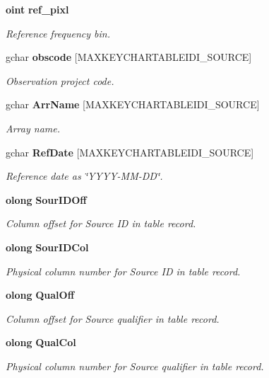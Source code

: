 \begin{CompactItemize}
{\bf oint} {\bf ref\_\-pixl}
\begin{CompactList}\small\item\em Reference frequency bin. \item\end{CompactList}\item 
gchar {\bf obscode} [MAXKEYCHARTABLEIDI\_\-SOURCE]
\begin{CompactList}\small\item\em Observation project code. \item\end{CompactList}\item 
gchar {\bf Arr\-Name} [MAXKEYCHARTABLEIDI\_\-SOURCE]
\begin{CompactList}\small\item\em Array name. \item\end{CompactList}\item 
gchar {\bf Ref\-Date} [MAXKEYCHARTABLEIDI\_\-SOURCE]
\begin{CompactList}\small\item\em Reference date as \char`\"{}YYYY-MM-DD\char`\"{}. \item\end{CompactList}\item 
{\bf olong} {\bf Sour\-IDOff}
\begin{CompactList}\small\item\em Column offset for Source ID in table record. \item\end{CompactList}\item 
{\bf olong} {\bf Sour\-IDCol}
\begin{CompactList}\small\item\em Physical column number for Source ID in table record. \item\end{CompactList}\item 
{\bf olong} {\bf Qual\-Off}
\begin{CompactList}\small\item\em Column offset for Source qualifier in table record. \item\end{CompactList}\item 
{\bf olong} {\bf Qual\-Col}
\begin{CompactList}\small\item\em Physical column number for Source qualifier in table record. \item\end{CompactList}\item 

\end{CompactItemize}

